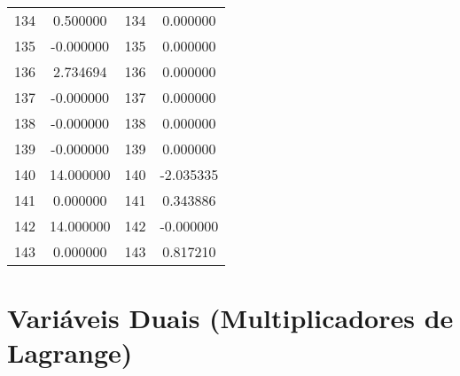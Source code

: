 \documentclass[12pt]{article}
\begin{document}
\begin{longtable}{@{}cccc@{}}
134 & 0.500000 & 134 & 0.000000 \\
135 & -0.000000 & 135 & 0.000000 \\
136 & 2.734694 & 136 & 0.000000 \\
137 & -0.000000 & 137 & 0.000000 \\
138 & -0.000000 & 138 & 0.000000 \\
139 & -0.000000 & 139 & 0.000000 \\
140 & 14.000000 & 140 & -2.035335 \\
141 & 0.000000 & 141 & 0.343886 \\
142 & 14.000000 & 142 & -0.000000 \\
143 & 0.000000 & 143 & 0.817210 \\

\end{longtable}

\section{Variáveis Duais (Multiplicadores de Lagrange)}
\end{document}
